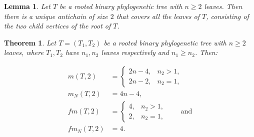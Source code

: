 \documentclass[10pt,a4paper]{amsart}
\newtheorem{theorem}{Theorem}
\newtheorem{lemma}{Lemma}
\begin{document}
\begin{lemma}\label{lem_len2anti}
    Let $T$ be a rooted binary phylogenetic tree with $n\geq 2$ leaves. Then there is a unique antichain of size $2$ that covers all the leaves of $T$, consisting of the two child vertices of the root of $T$.
\end{lemma}

\begin{theorem}\label{thm:binary.summary}
Let \(T=(T_1,T_2)\) be a rooted binary phylogenetic tree with
\(n\ge 2\) leaves, where \(T_1,T_2\) have \(n_1,n_2\) leaves respectively and \(n_1\ge n_2\). Then:

\begin{align*}
m(T,2) &=
\begin{cases}
2n-4,& n_2>1,\\
2n-2,& n_2=1,
\end{cases} \\
m_N(T,2)&=4n-4,\\
fm(T,2) &=
\begin{cases}
4,& n_2>1,\\
2,& n_2=1,
\end{cases} \qquad \text{and}\\
fm_N(T,2)&=4.
\end{align*}
\end{theorem}
\end{document}
